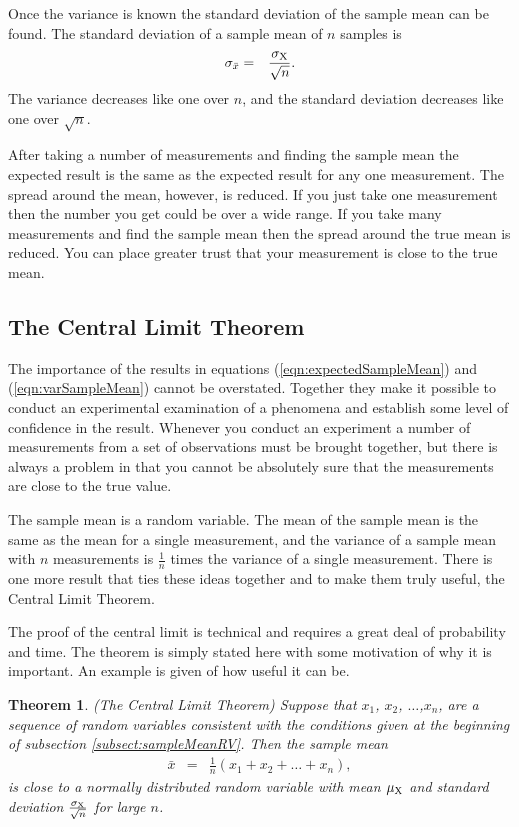 \documentclass[12pt]{article}
\newtheorem{theorem}{Theorem}[section]
\newcommand{\lp}{\left(}
\newcommand{\rp}{\right)}
\begin{document}
Once the variance is known the standard deviation of the sample mean
can be found. The standard deviation of a sample mean of $n$ samples
is
\begin{eqnarray}
  \label{eqn:sdSampleMean}
  \sigma_{\bar{x}} & = & \frac{\sigma_{\rm X}}{\sqrt{n}}.
\end{eqnarray}
The variance decreases like one over $n$, and the standard deviation
decreases like one over $\sqrt{n}$.

After taking a number of measurements and finding the sample mean the
expected result is the same as the expected result for any one
measurement. The spread around the mean, however, is reduced.  If you
just take one measurement then the number you get could be over a wide
range. If you take many measurements and find the sample mean then the
spread around the true mean is reduced. You can place greater trust
that your measurement is close to the true mean.



\subsection{The Central Limit Theorem}

The importance of the results in equations
(\ref{eqn:expectedSampleMean}) and (\ref{eqn:varSampleMean}) cannot be
overstated. Together they make it possible to conduct an experimental
examination of a phenomena and establish some level of confidence in
the result. Whenever you conduct an experiment a number of
measurements from a set of observations must be brought together, but
there is always a problem in that you cannot be absolutely sure that
the measurements are close to the true value.

The sample mean is a random variable. The mean of the sample mean is
the same as the mean for a single measurement, and the variance of a
sample mean with $n$ measurements is $\frac{1}{n}$ times the variance
of a single measurement. There is one more result that ties these
ideas together and to make them truly useful, the Central Limit
Theorem.

The proof of the central limit is technical and requires a great deal
of probability and time. The theorem is simply stated here with some
motivation of why it is important. An example is given of how useful
it can be.

\begin{theorem}
  \label{thm:centralLimit}
  (The Central Limit Theorem) Suppose that $x_1$, $x_2$,
  $\ldots$,$x_n$, are a sequence of random variables consistent with
  the conditions given at the beginning of subsection
  \ref{subsect:sampleMeanRV}. Then the sample mean
  \begin{eqnarray*}
    \bar{x} & = & \frac{1}{n} \lp x_1+x_2+\ldots +x_n \rp,
  \end{eqnarray*}
  is close to a normally distributed random variable with mean
  $\mu_{\rm X}$ and standard deviation $\frac{\sigma_{\rm
      X}}{\sqrt{n}}$ for large $n$.
\end{theorem}
\end{document}
